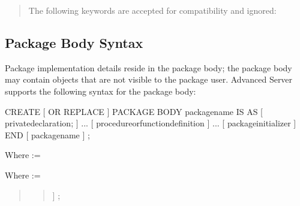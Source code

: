\documentclass[letterpaper,10pt,english,openany,oneside]{sphinxmanual}
\begin{document}
\begin{quote}

The following keywords are accepted for compatibility and ignored:





\end{quote}

\newpage


\subsection{Package Body Syntax}
\label{\detokenize{package_components:package-body-syntax}}
Package implementation details reside in the package body; the package
body may contain objects that are not visible to the package user.
Advanced Server supports the following syntax for the package body:

%
\begin{sphinxVerbatim}[commandchars=\\\{\}]
CREATE [ OR REPLACE ] PACKAGE BODY \PYGZlt{}package\PYGZus{}name\PYGZgt{}
  \PYGZob{} IS \textbar{} AS \PYGZcb{}
  [ \PYGZlt{}private\PYGZus{}declaration\PYGZgt{}; ] ...
  [ \PYGZlt{}procedure\PYGZus{}or\PYGZus{}function\PYGZus{}definition\PYGZgt{} ] ...
  [ \PYGZlt{}package\PYGZus{}initializer\PYGZgt{} ]
  END [ \PYGZlt{}package\PYGZus{}name\PYGZgt{} ] ;
\end{sphinxVerbatim}

Where  :=
\begin{quote}

\end{quote}

Where  :=
\begin{quote}

\begin{quote}


\begin{quote}

\end{quote}

\sphinxcode{END {[} \textless{}proc\_name\textgreater{}} {]} ;
\end{quote}
\end{quote}
\end{document}
